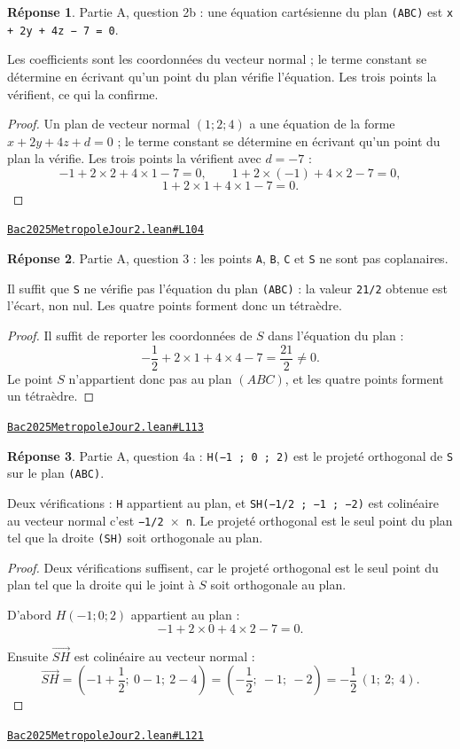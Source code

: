 \documentclass[11pt,a4paper]{article}
\theoremstyle{definition}
\theoremstyle{plain}
\theoremstyle{definition}
\newtheorem*{reponse}{Réponse}
\newcommand{\source}[2]{\par\smallskip\noindent\hfill{\footnotesize\href{#1}{\texttt{#2}}}\par\smallskip}
\begin{document}
\begin{reponse}
Partie A, question 2b : une équation cartésienne du plan \texttt{(ABC)} est
\texttt{x + 2y + 4z − 7 = 0}.

Les coefficients sont les coordonnées du vecteur normal ; le terme constant se
détermine en écrivant qu'un point du plan vérifie l'équation. Les trois points la
vérifient, ce qui la confirme.
\end{reponse}
\begin{proof}
Un plan de vecteur normal $(1 ; 2 ; 4)$ a une équation de la forme $x + 2y + 4z + d = 0$ ;
le terme constant se détermine en écrivant qu'un point du plan la vérifie. Les trois
points la vérifient avec $d = -7$ :
\[ -1 + 2 \times 2 + 4 \times 1 - 7 = 0, \qquad
   1 + 2 \times (-1) + 4 \times 2 - 7 = 0, \]
\[ 1 + 2 \times 1 + 4 \times 1 - 7 = 0 . \]
\end{proof}
\source{https://github.com/Commutator-IO/learn-lean/blob/main/exams/2025/Bac2025MetropoleJour2.lean\#L104}{Bac2025MetropoleJour2.lean\#L104}

\begin{reponse}
Partie A, question 3 : les points \texttt{A}, \texttt{B}, \texttt{C} et \texttt{S} ne sont pas coplanaires.

Il suffit que \texttt{S} ne vérifie pas l'équation du plan \texttt{(ABC)} : la valeur \texttt{21/2} obtenue
est l'écart, non nul. Les quatre points forment donc un tétraèdre.
\end{reponse}
\begin{proof}
Il suffit de reporter les coordonnées de $S$ dans l'équation du plan :
\[ -\frac{1}{2} + 2 \times 1 + 4 \times 4 - 7 = \frac{21}{2} \ne 0 . \]
Le point $S$ n'appartient donc pas au plan $(ABC)$, et les quatre points forment un
tétraèdre.
\end{proof}
\source{https://github.com/Commutator-IO/learn-lean/blob/main/exams/2025/Bac2025MetropoleJour2.lean\#L113}{Bac2025MetropoleJour2.lean\#L113}

\begin{reponse}
Partie A, question 4a : \texttt{H(−1 ; 0 ; 2)} est le projeté orthogonal de \texttt{S} sur le
plan \texttt{(ABC)}.

Deux vérifications : \texttt{H} appartient au plan, et \texttt{SH(−1/2 ; −1 ; −2)} est colinéaire au
vecteur normal \textemdash{} c'est \texttt{−1/2 \(\times\) n}. Le projeté orthogonal est le seul point du plan tel
que la droite \texttt{(SH)} soit orthogonale au plan.
\end{reponse}
\begin{proof}
Deux vérifications suffisent, car le projeté orthogonal est le seul point du plan tel que
la droite qui le joint à $S$ soit orthogonale au plan.

D'abord $H(-1 ; 0 ; 2)$ appartient au plan :
\[ -1 + 2 \times 0 + 4 \times 2 - 7 = 0 . \]

Ensuite $\vec{SH}$ est colinéaire au vecteur normal :
\[ \vec{SH} = \left(-1 + \frac{1}{2} ;\ 0 - 1 ;\ 2 - 4\right)
   = \left(-\frac{1}{2} ;\ -1 ;\ -2\right) = -\frac{1}{2}\,(1 ;\ 2 ;\ 4) . \]
\end{proof}
\source{https://github.com/Commutator-IO/learn-lean/blob/main/exams/2025/Bac2025MetropoleJour2.lean\#L121}{Bac2025MetropoleJour2.lean\#L121}
\end{document}
